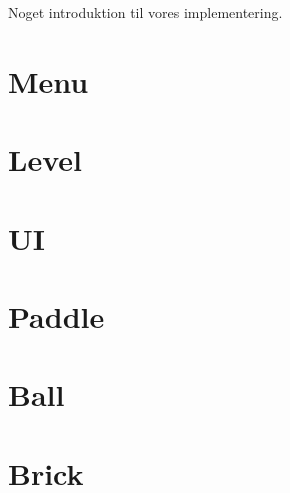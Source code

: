 Noget introduktion til vores implementering.

\section{Menu}


\section{Level}


\section{UI}


\section{Paddle}


\section{Ball}


\section{Brick}

